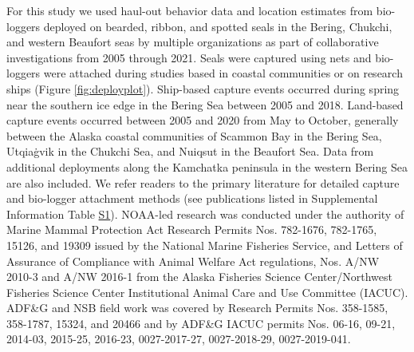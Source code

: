 \documentclass[fleqn,10pt,lineno]{wlpeerj} %
\begin{document}
For this study we used haul-out behavior data and location estimates from
bio-loggers deployed on bearded, ribbon, and spotted seals in the Bering,
Chukchi, and western Beaufort seas by multiple organizations as part of
collaborative investigations from 2005 through 2021. Seals were captured using
nets and bio-loggers were attached during studies based in coastal communities
or on research ships (Figure \ref{fig:deployplot}). Ship-based capture events
occurred during spring near the southern ice edge in the Bering Sea between 2005
and 2018. Land-based capture events occurred between 2005 and 2020 from May to
October, generally between the Alaska coastal communities of Scammon Bay in the
Bering Sea, Utqiaġvik in the Chukchi Sea, and Nuiqsut in the Beaufort Sea. Data
from additional deployments along the Kamchatka peninsula in the western Bering
Sea are also included. We refer readers to the primary literature for detailed
capture and bio-logger attachment methods (see publications listed in
Supplemental Information Table \hyperref[s1]{S1}). NOAA-led research was conducted under the
authority of Marine Mammal Protection Act Research Permits Nos. 782-1676,
782-1765, 15126, and 19309 issued by the National Marine Fisheries Service, and
Letters of Assurance of Compliance with Animal Welfare Act regulations, Nos.
A/NW 2010-3 and A/NW 2016-1 from the Alaska Fisheries Science Center/Northwest
Fisheries Science Center Institutional Animal Care and Use Committee (IACUC).
ADF\&G and NSB field work was covered by Research Permits Nos. 358-1585,
358-1787, 15324, and 20466 and by ADF\&G IACUC permits Nos. 06-16, 09-21,
2014-03, 2015-25, 2016-23, 0027-2017-27, 0027-2018-29, 0027-2019-041.
\end{document}
